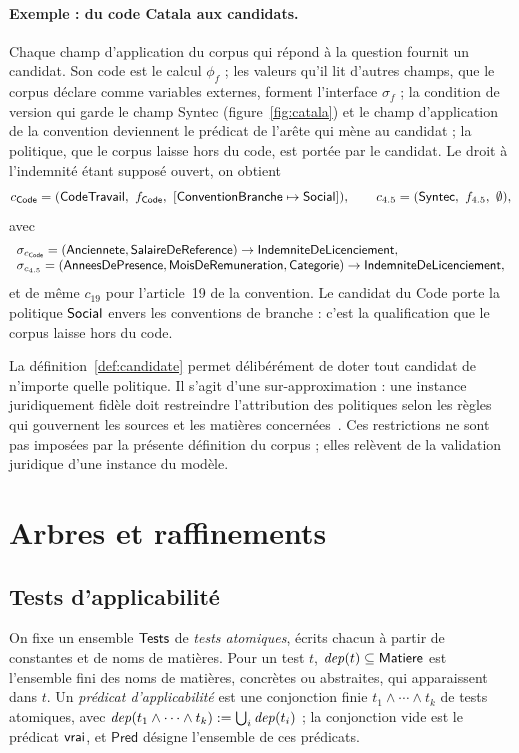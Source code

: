 \documentclass[review]{jflart}
\newcommand{\Categorie}{\ensuremath{\mathsf{Categorie}}}
\newcommand{\Presence}{\ensuremath{\mathsf{AnneesDePresence}}}
\newcommand{\MoisRem}{\ensuremath{\mathsf{MoisDeRemuneration}}}
\newcommand{\Pred}{\ensuremath{\mathsf{Pred}}}
\renewcommand{\Indem}{\ensuremath{\mathsf{IndemniteDeLicenciement}}}
\begin{document}
\paragraph{Exemple : du code Catala aux candidats.}
Chaque champ d'application du corpus qui répond à la question fournit un
candidat. Son code est le calcul \(\phi_f\) ; les valeurs qu'il lit
d'autres champs, que le corpus déclare comme variables externes, forment
l'interface \(\sigma_f\) ; la condition de version qui garde le champ Syntec
(figure~\ref{fig:catala}) et le champ d'application de la convention deviennent
le prédicat de l'arête qui mène au candidat ; la politique, que le corpus
laisse hors du code, est portée par le candidat. Le droit à l'indemnité étant supposé
ouvert, on obtient
\[
c_{\mathsf{Code}}=(\CodeTravail,\ f_{\mathsf{Code}},\ [\ConvBranche\mapsto\Social]),
\qquad
c_{4.5}=(\Syntec,\ f_{4.5},\ \emptyset),
\]
avec
\[
\begin{array}{l}
\sigma_{c_{\mathsf{Code}}}=(\Senior,\Salary)\to\Indem,\\
\sigma_{c_{4.5}}=(\Presence,\MoisRem,\Categorie)\to\Indem,
\end{array}
\]
et de même \(c_{19}\) pour l'article~19 de la convention. Le candidat du Code
porte la politique \(\mathsf{Social}\) envers les conventions de branche : c'est la
qualification que le corpus laisse hors du code.

\begin{remark}
La définition~\ref{def:candidate} permet délibérément de doter tout candidat de
n'importe quelle politique. Il s'agit d'une sur-approximation : une instance
juridiquement fidèle doit restreindre l'attribution des politiques selon les
règles qui gouvernent les sources et les matières
concernées~\cite{daugareilh2019sources}. Ces restrictions ne sont pas imposées
par la présente définition du corpus ; elles relèvent de la validation
juridique d'une instance du modèle.
\end{remark}

\section{Arbres et raffinements}\label{sec:forest}

\subsection{Tests d'applicabilité}

On fixe un ensemble \(\mathsf{Tests}\) de \emph{tests atomiques}, écrits chacun à
partir de constantes et de noms de matières. Pour un test \(t\),
\(\mathit{dep}(t)\subseteq\mathsf{Matiere}\) est l'ensemble fini des noms de matières,
concrètes ou abstraites, qui apparaissent dans \(t\). Un \emph{prédicat
d'applicabilité} est une conjonction finie \(t_1\land\cdots\land t_k\) de tests
atomiques, avec \(\mathit{dep}(t_1\land\cdots\land t_k):=\bigcup_i\mathit{dep}(t_i)\) ; la
conjonction vide est le prédicat \(\mathsf{vrai}\), et \(\Pred\) désigne l'ensemble de
ces prédicats.
\end{document}
